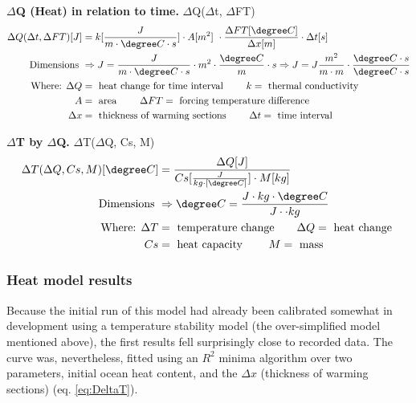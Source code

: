 \documentclass{article}
\begin{document}
\textbf{$\Delta$Q (Heat) in relation to time.}  $\Delta$Q($\Delta$t, $\Delta$FT) 
\begin{align}
    \begin{split} \label{eq:DeltaQ}
 \Delta Q(\Delta t, \Delta FT)[J]  &= k[\frac{J}{m \cdot \text{$\degree$}C \cdot s}] \cdot A[m^2]\ \cdot \frac{\Delta FT[\text{$\degree$}C] }{\Delta x[m]} \cdot \Delta t[s]  \\
 \text{Dimensions } &\Rightarrow J  = \frac{J}{m \cdot \text{$\degree$}C \cdot s} \cdot m^2  \cdot \frac{\text{$\degree$}C }{m} \cdot s 
  \Rightarrow J  = J \frac{m^2}{m \cdot m} \cdot \frac{\text{$\degree$}C \cdot s }{\text{$\degree$}C \cdot s} \\
\text{Where: } \Delta Q &= \text{ heat change for time interval } \qquad
   k = \text{ thermal conductivity }\\
  A &= \text{ area } \qquad
 \Delta FT = \text{ forcing temperature difference }  \\
  \Delta x &= \text{ thickness of warming sections }  \qquad  
  \Delta t = \text{ time interval }  \\ 
  \end{split}
\end{align}

\textbf{$\Delta$T by $\Delta$Q.} $\Delta$T($\Delta$Q, Cs, M) 
\begin{align}
    \begin{split} \label{eq:DeltaT}
 \Delta T(\Delta Q, Cs, M)[\text{$\degree$}C] &= \frac{\Delta Q[J]}{Cs[\frac{J}{kg \cdot [\text{$\degree$}C]}]\cdot M[kg]}   \\
 \text{Dimensions } &\Rightarrow \text{$\degree$}C  = \frac{J \cdot kg \cdot \text{$\degree$}C}{J \cdot \cdot kg}  
 \\
\text{Where: } \Delta T &= \text{ temperature change} \qquad
\Delta Q = \text{ heat change } \\
   Cs &= \text{ heat capacity } \qquad 
 M = \text{ mass } \\
  \end{split}
\end{align}


\subsubsection{Heat model results}
Because the initial run of this model had already been calibrated somewhat in development using a temperature stability model (the over-simplified model mentioned above), the first results fell surprisingly close to recorded data. The curve was, nevertheless, fitted using an $R^2$ minima algorithm over two parameters, initial ocean heat content, and the $\Delta x$ (thickness of warming sections) (eq. \ref{eq:DeltaT}).
\end{document}
